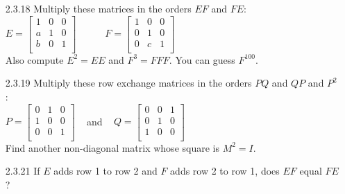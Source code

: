 \documentclass[10pt,twoside,reqno]{article}
\begin{document}
\begin{enumerate}
\vspace{3mm}
\item[2.3.18]Multiply these matrices in the orders $EF$ and $FE$: \\
\vspace{3mm}
\hspace{105pt}
$
$$
E=
\begin{bmatrix}
1&0&0\\
a&1&0\\
b&0&1\\
\end{bmatrix}
\hspace{35pt}
F=
\begin{bmatrix}
1&0&0\\
0&1&0\\
0&c&1\\
\end{bmatrix}
$$
$
\vspace{3mm}\\
Also compute $E^2 = EE$ and $F^3 = FFF$. You can guess $F^{100}$. 
\vspace{3mm}
\item[2.3.19]Multiply these row exchange matrices in the orders $PQ$ and $QP$ and $P^2$ : \\
\vspace{3mm}
\hspace{105pt}
$
$$
P=
\begin{bmatrix}
0&1&0\\
1&0&0\\
0&0&1\\
\end{bmatrix}
\hspace{10pt}
$$
$
and
$
$$
\hspace{10pt}
Q=
\begin{bmatrix}
0&0&1\\
0&1&0\\
1&0&0\\
\end{bmatrix}
$$
$
\vspace{3mm}\\
Find another non-diagonal matrix whose square is $M^2 = I$.
\vspace{3mm}
\item[2.3.21]If $E$ adds row 1 to row 2 and $F$ adds row 2 to row 1, does $EF$ equal $FE$? \\

\end{enumerate}
\end{document}
